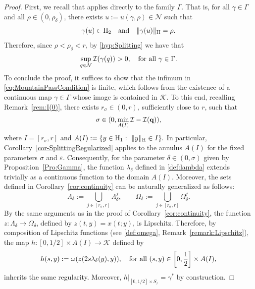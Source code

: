 \documentclass{article}
\newcommand{\boK}{\mathcal{K}}
\newcommand{\boI}{\mathcal{I}}
\newcommand{\boN}{\mathcal{N}}
\newcommand{\Hilb}{{\textnormal H}}
\newcommand{\minq}{{\bf q}}
\theoremstyle{definition}
\begin{document}
\begin{proof}
First, we recall that \cite[Lemma 3]{Bre-Nir} applies directly to the family $\Gamma$. That is, for all $\gamma\in\Gamma$ and all $\rho\in(0,\rho_\delta)$, there exists  $u:=u(\gamma,\rho)\in\boN$ such that
\begin{equation}\label{eq:intersectionBN}
\gamma(u)\in\Hilb_2\quad\hbox{and}\quad\|\gamma(u)\|_\Hilb=\rho.
\end{equation}
Therefore, since $\rho<\rho_\delta<r$, by  \eqref{hyp:Splitting} we have that
\begin{equation}\label{eq:supremumGamma}
    \sup_{q\in\boN}\boI(\gamma(q))>0,\quad\hbox{for all }\gamma\in\Gamma.
\end{equation}
To conclude the proof, it suffices to show that the infimum in \eqref{eq:MountainPassCondition} is finite, which follows from the existence of a continuous map $\gamma \in \Gamma$ whose image is contained in $\boK$. To this end, recalling Remark~\ref{rem:I(0)}, there exists $r_\sigma \in (0,r)$, sufficiently close to $r$, such that
\begin{equation}
    \sigma\in(0,\min_{A(I)}\boI-\boI(\minq)),
\end{equation}
where $I=[r_\sigma,r]$ and $
A(I):=\{y\in\Hilb_1:\ \|y\|_\Hilb\in I\}.$ 
In particular, Corollary~\ref{cor-SplittingRegularized} applies to the annulus $A(I)$ for the fixed parameters $\sigma$ and $\varepsilon$. Consequently, for the parameter $\delta\in(0,\sigma)$ given by Proposition~\ref{Pro:Gamma}, the function $\lambda_\delta$ defined in \eqref{def:lambda} extends trivially as a continuous function to the domain $A(I)$. Moreover, the sets defined in Corollary~\ref{cor:continuity} can be naturally generalized as follows:
\begin{equation}
\Lambda_\delta:=\bigcup_{j\in[r_\sigma,r]}\Lambda_\delta^j,\qquad\Omega_\delta:=\bigcup_{j\in[r_\sigma,r]}\Omega_\delta^j.
\end{equation}
By the same arguments as in the proof of Corollary~\ref{cor:continuity}, the function $z:\Lambda_\delta\to\Omega_\delta$, defined by $z(t,y)=x(t;y)$, is Lipschitz. Therefore, by composition of Lipschitz functions (see \eqref{def:omega}, Remark~\ref{remark:Lipschitz}), the map $h:[0,1/2]\times A(I)\to\boK$ defined by
\begin{equation}\label{def:function-h}
    h(s,y):=\omega(z(2s\lambda_\delta(y),y)),\quad\hbox{for all }(s,y)\in \left[0,\frac12\right]\times A(I),
\end{equation}
inherits the same regularity. Moreover, $h|_{[0,1/2]\times S_r}=\gamma^*$ by construction.


\end{proof}
\end{document}
